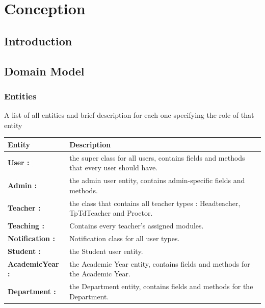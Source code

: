 \documentclass[]{uc2pfecaneva}
\begin{document}
    \setlength{\parskip}{6pt}
    \tableofcontents
    \listoffigures
    \listoftables
    \chapter{Conception}
    \newpage

    \raggedright\section{Introduction}
    \raggedright\section{Domain Model}

    \begin{table}
        \raggedright\subsection{Entities}
        A list of all entities and brief description for each one specifying the role of that entity\linebreak \\
        \begin{tabularx}{\textwidth}{|l|X|}
            \hline
            Entity          & Description                                                                                                                                                                \\ \hline
            \textbf{User :} & the super class for all users, contains fields and methods that every user should have.\\ \hline
            \textbf{Admin :} & the admin user entity, contains admin-specific fields and methods.\\ \hline
            \textbf{Teacher :} & the class that contains all teacher types : Headteacher, TpTdTeacher and Proctor.\\ \hline
            \textbf{Teaching :} & Contains every teacher's assigned modules.\\ \hline
            \textbf{Notification :} & Notification class for all user types.\\ \hline
            \textbf{Student :} & the Student user entity.\\ \hline
            \textbf{AcademicYear :} & the Academic Year entity, contains fields and methods for the Academic Year.\\ \hline
            \textbf{Department :} & the Department entity, contains fields and methods for the Department.\\ \hline

\end{tabularx}
\end{table}
\end{document}
